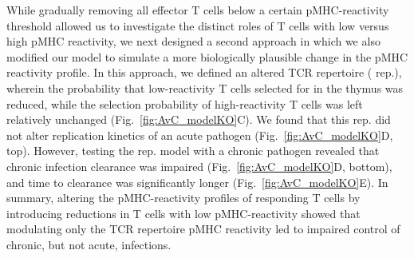 While gradually removing all effector T cells below a certain pMHC-reactivity threshold allowed us to investigate the distinct roles of T cells with low versus high pMHC reactivity, we next designed a second approach in which we also modified our model to simulate a more biologically plausible change in the pMHC reactivity profile. In this approach, we defined an altered TCR repertoire (\dTCR{} rep.), wherein the probability that low-reactivity T cells selected for in the thymus was reduced, while the selection probability of high-reactivity T cells was left relatively unchanged (Fig.~\ref{fig:AvC_modelKO}C). We found that this \dTCR{} rep. did not alter replication kinetics of an acute pathogen (Fig.~\ref{fig:AvC_modelKO}D, top). However, testing the \dTCR{} rep. model with a chronic pathogen revealed that chronic infection clearance was impaired (Fig.~\ref{fig:AvC_modelKO}D, bottom), and time to clearance was significantly longer (Fig.~\ref{fig:AvC_modelKO}E). In summary, altering the pMHC-reactivity profiles of responding T cells by introducing reductions in T cells with low pMHC-reactivity showed that modulating only the TCR repertoire pMHC reactivity led to impaired control of chronic, but not acute, infections.

